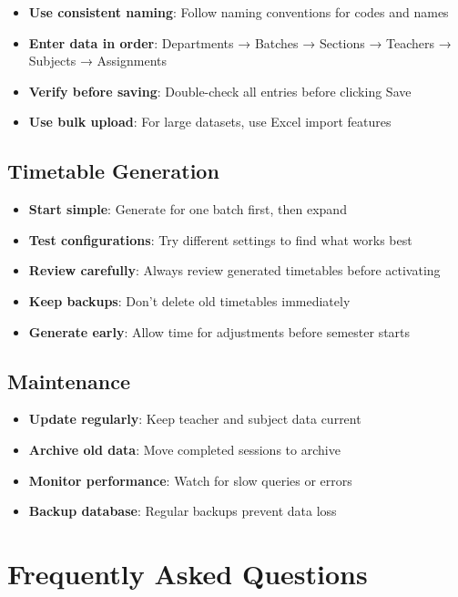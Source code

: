 \documentclass[12pt,a4paper]{article}
\begin{document}
\begin{itemize}
\item \textbf{Use consistent naming}: Follow naming conventions for codes and names
\item \textbf{Enter data in order}: Departments → Batches → Sections → Teachers → Subjects → Assignments
\item \textbf{Verify before saving}: Double-check all entries before clicking Save
\item \textbf{Use bulk upload}: For large datasets, use Excel import features
\end{itemize}

\subsection{Timetable Generation}

\begin{itemize}
\item \textbf{Start simple}: Generate for one batch first, then expand
\item \textbf{Test configurations}: Try different settings to find what works best
\item \textbf{Review carefully}: Always review generated timetables before activating
\item \textbf{Keep backups}: Don't delete old timetables immediately
\item \textbf{Generate early}: Allow time for adjustments before semester starts
\end{itemize}

\subsection{Maintenance}

\begin{itemize}
\item \textbf{Update regularly}: Keep teacher and subject data current
\item \textbf{Archive old data}: Move completed sessions to archive
\item \textbf{Monitor performance}: Watch for slow queries or errors
\item \textbf{Backup database}: Regular backups prevent data loss
\end{itemize}

\section{Frequently Asked Questions}
\end{document}
